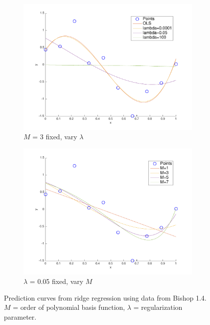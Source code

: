 \begin{figure}[h!]
\centering
    \begin{subfigure}[b]{0.4\textwidth}
	\includegraphics[scale=0.55]{hw1_3_1a.pdf}
	\caption{$M$ = 3 fixed, vary $\lambda$}
    \end{subfigure}
    \quad
    \begin{subfigure}[b]{0.4\textwidth}
	\includegraphics[scale=0.55]{hw1_3_1b.pdf}
	\caption{$\lambda$ = 0.05 fixed, vary $M$}
    \end{subfigure}
\caption{Prediction curves from ridge regression using data from Bishop 1.4.  $M$ = order of polynomial basis function, $\lambda$ = regularization parameter.} \label{fig:ridge_plots}
\end{figure}

